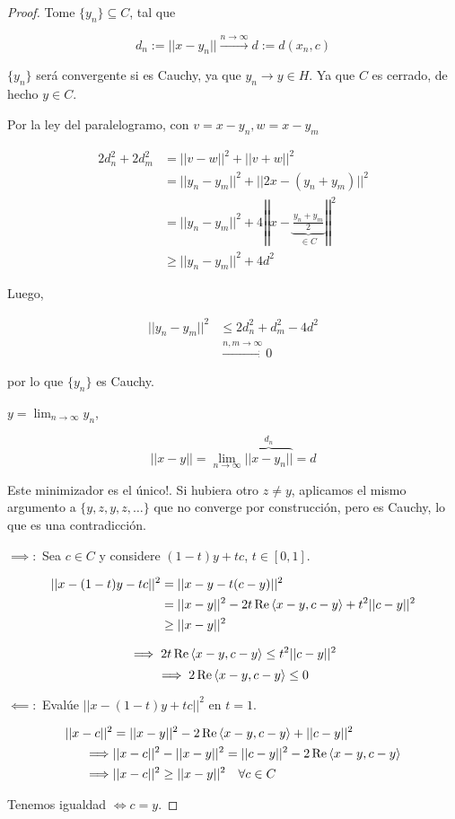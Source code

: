 \begin{proof}
    Tome $\{y_n\}\subseteq C$, tal que 

    \[d_n:=||x-y_n||\xrightarrow{n\to\infty} d:=d(x_n,c)\]

    $\{y_n\}$ será convergente si es Cauchy, ya que $y_n\to y\in H$. Ya que $C$ es cerrado, de hecho $y\in C$.

    Por la ley del paralelogramo, con $v=x-y_n,w=x-y_m$

    \begin{align*}
        2 d_n^2+2 d_m^2&=||v-w||^2+||v+w||^2\\
        &=||y_n-y_m||^2+||2x-(y_n+y_m)||^2\\
        &=||y_n-y_m||^2+4\left|\left|x-\underbrace{\frac{y_n+y_m}{2}}_{\in C}\right|\right|^2\\
        &\geq ||y_n-y_m||^2+4d^2
    \end{align*}

    Luego,

    \begin{align*}
        ||y_n-y_m||^2&\leq 2d_n^2+d_m^2-4d^2\\
        &\xrightarrow{n,m\to\infty} 0
    \end{align*}

    por lo que $\{y_n\}$ es Cauchy.

    $y=\displaystyle\lim_{n\to\infty} y_n$,

    \[||x-y||=\lim_{n\to\infty} \overbrace{||x-y_n||}^{d_n}=d\]

    Este minimizador es el único!. Si hubiera otro $z\neq y$, aplicamos el mismo argumento a $\{y,z,y,z,\ldots\}$ que no converge por construcción, pero es Cauchy, lo que es una contradicción.

    $\implies:$ Sea $c\in C$ y considere $(1-t)y+tc$, $t\in [0,1]$.

    \begin{align*}
        ||x-(1-t)y-tc||^2&=||x-y-t(c-y)||^2\\
        &=||x-y||^2-2t\operatorname{Re} \left\langle x-y,c-y\right\rangle+t^2||c-y||^2\\
        &\geq ||x-y||^2
    \end{align*}

    \[\implies 2t\operatorname{Re} \left\langle x-y,c-y\right\rangle\leq t^2||c-y||^2\]
    \[\implies 2\operatorname{Re} \left\langle x-y,c-y\right\rangle\leq 0\]

    $\impliedby:$ Evalúe $||x-(1-t)y+tc||^2$ en $t=1$.

    \begin{align*}
        ||x-c||^2&=||x-y||^2-2\operatorname{Re} \left\langle x-y,c-y\right\rangle+||c-y||^2\\
        \implies & ||x-c||^2-||x-y||^2=||c-y||^2-2\operatorname{Re} \left\langle x-y,c-y\right\rangle\\
        \implies &||x-c||^2\geq ||x-y||^2\quad \forall c\in C
    \end{align*}

    Tenemos igualdad $\iff c=y$. 
\end{proof}


